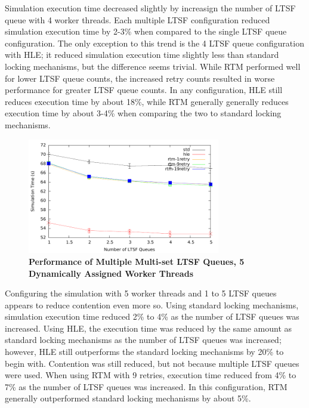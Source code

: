 \documentclass[11pt]{book}
\begin{document}
Simulation execution time decreased slightly by increasign the number of LTSF
queue with 4 worker threads.  Each multiple LTSF configuration reduced
simulation execution time by 2-3\% when compared to the single LTSF queue
configuration.  The only exception to this trend is the 4 LTSF queue
configuration with HLE; it reduced simulation execution time slightly less than
standard locking mechanisms, but the difference seems trivial.  While RTM
performed well for lower LTSF queue counts, the increased retry counts resulted
in worse performance for greater LTSF queue counts.  In any configuration, HLE
still reduces execution time by about 18\%, while RTM generally generally
reduces execution time by about 3-4\% when comparing the two to standard locking
mechanisms.

\begin{figure}
    \centering
    \graphicspath{ {./figures/} }
    \includegraphics[width=0.75\textwidth,keepaspectratio]{hugeepidemicsim-CONTmig-timeVSschedQs-multiset-5thread}
    \caption{\textbf{Performance of Multiple Multi-set LTSF Queues, 5 Dynamically Assigned Worker Threads}}
    \label{fig:contThrMig_timeVSschq_5threads}
\end{figure}

Configuring the simulation with 5 worker threads and 1 to 5 LTSF queues appears
to reduce contention even more so.  Using standard locking mechanisms,
simulation execution time reduced 2\% to 4\% as the number of LTSF queues was
increased.  Using HLE, the execution time was reduced by the same amount as
standard locking mechanisms as the number of LTSF queues was increased; however,
HLE still outperforms the standard locking mechanisms by 20\% to begin with.
Contention was still reduced, but not because multiple LTSF queues were used.
When using RTM with 9 retries, execution time reduced from 4\% to 7\% as the
number of LTSF queues was increased.  In this configuration, RTM generally
outperformed standard locking mechanisms by about 5\%.
\end{document}
